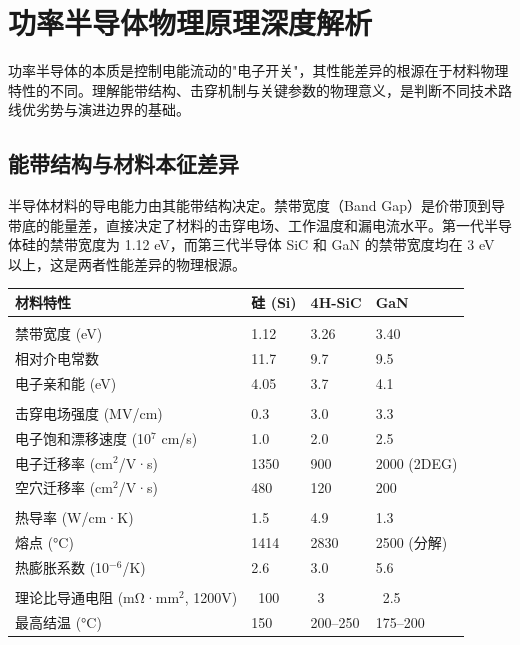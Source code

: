 
\section{功率半导体物理原理深度解析}

功率半导体的本质是控制电能流动的"电子开关"，其性能差异的根源在于材料物理特性的不同。理解能带结构、击穿机制与关键参数的物理意义，是判断不同技术路线优劣势与演进边界的基础。

\subsection{能带结构与材料本征差异}

半导体材料的导电能力由其能带结构决定。禁带宽度（Band Gap）是价带顶到导带底的能量差，直接决定了材料的击穿电场、工作温度和漏电流水平。第一代半导体硅的禁带宽度为 1.12 eV，而第三代半导体 SiC 和 GaN 的禁带宽度均在 3 eV 以上，这是两者性能差异的物理根源。

\begin{exhibitbox}[表 4-3：三种半导体材料本征参数对比]
\centering
\small
\setlength{\tabcolsep}{4pt}
\begin{tabularx}{\textwidth}{L{3.2cm} C{2.8cm} C{2.8cm} C{2.8cm}}
\toprule
\textbf{材料特性} & \textbf{硅 (Si)} & \textbf{4H-SiC} & \textbf{GaN} \\
\midrule
{}
 \\
禁带宽度 (eV) & 1.12 & 3.26 & 3.40 \\
相对介电常数 & 11.7 & 9.7 & 9.5 \\
电子亲和能 (eV) & 4.05 & 3.7 & 4.1 \\
\midrule
{}
 \\
击穿电场强度 (MV/cm) & 0.3 & 3.0 & 3.3 \\
电子饱和漂移速度 (10$^7$ cm/s) & 1.0 & 2.0 & 2.5 \\
电子迁移率 (cm$^2$/V·s) & 1350 & 900 & 2000 (2DEG) \\
空穴迁移率 (cm$^2$/V·s) & 480 & 120 & 200 \\
\midrule
{}
 \\
热导率 (W/cm·K) & 1.5 & 4.9 & 1.3 \\
熔点 (°C) & 1414 & 2830 & 2500 (分解) \\
热膨胀系数 (10$^{-6}$/K) & 2.6 & 3.0 & 5.6 \\
\midrule
{}
 \\
理论比导通电阻 (mΩ·mm$^2$, 1200V) & ~100 & ~3 & ~2.5 \\
最高结温 (°C) & 150 & 200–250 & 175–200 \\
\bottomrule
\end{tabularx}
\end{exhibitbox}

